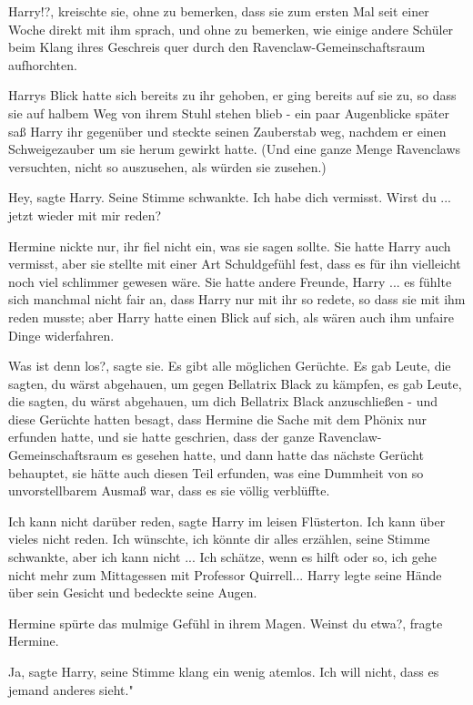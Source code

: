 \glqq Harry!?\grqq{}, kreischte sie, ohne zu bemerken, dass sie zum ersten Mal
seit einer Woche direkt mit ihm sprach, und ohne zu bemerken, wie einige andere
Schüler beim Klang ihres Geschreis quer durch den Ravenclaw-Gemeinschaftsraum
aufhorchten.

Harrys Blick hatte sich bereits zu ihr gehoben, er ging bereits auf sie zu, so
dass sie auf halbem Weg von ihrem Stuhl stehen blieb - ein paar Augenblicke
später saß Harry ihr gegenüber und steckte seinen Zauberstab weg, nachdem er
einen Schweigezauber um sie herum gewirkt hatte. (Und eine ganze Menge
Ravenclaws versuchten, nicht so auszusehen, als würden sie zusehen.)

\glqq Hey\grqq{}, sagte Harry. Seine Stimme schwankte. \glqq Ich habe dich
vermisst. Wirst du ... jetzt wieder mit mir reden?\grqq{}

Hermine nickte nur, ihr fiel nicht ein, was sie sagen sollte. Sie hatte Harry
auch vermisst, aber sie stellte mit einer Art Schuldgefühl fest, dass es für ihn
vielleicht noch viel schlimmer gewesen wäre. Sie hatte andere Freunde, Harry ...
es fühlte sich manchmal nicht fair an, dass Harry nur mit ihr so redete, so dass
sie mit ihm reden musste; aber Harry hatte einen Blick auf sich, als wären auch
ihm unfaire Dinge widerfahren.

\glqq Was ist denn los?\grqq{}, sagte sie. \glqq Es gibt alle möglichen
Gerüchte. Es gab Leute, die sagten, du wärst abgehauen, um gegen Bellatrix Black
zu kämpfen, es gab Leute, die sagten, du wärst abgehauen, um dich Bellatrix
Black anzuschließen -\grqq{} und diese Gerüchte hatten besagt, dass Hermine die
Sache mit dem Phönix nur erfunden hatte, und sie hatte geschrien, dass der ganze
Ravenclaw-Gemeinschaftsraum es gesehen hatte, und dann hatte das nächste Gerücht
behauptet, sie hätte auch diesen Teil erfunden, was eine Dummheit von so
unvorstellbarem Ausmaß war, dass es sie völlig verblüffte.

\glqq Ich kann nicht darüber reden\grqq{}, sagte Harry im leisen Flüsterton.
\glqq Ich kann über vieles nicht reden. Ich wünschte, ich könnte dir alles
erzählen\grqq{}, seine Stimme schwankte, \glqq aber ich kann nicht ... Ich
schätze, wenn es hilft oder so, ich gehe nicht mehr zum Mittagessen mit
Professor Quirrell...\grqq{} Harry legte seine Hände über sein Gesicht und
bedeckte seine Augen.

Hermine spürte das mulmige Gefühl in ihrem Magen. \glqq Weinst du etwa?\grqq{},
fragte Hermine.

\glqq Ja\grqq{}, sagte Harry, seine Stimme klang ein wenig atemlos. \glqq Ich
will nicht, dass es jemand anderes sieht."

